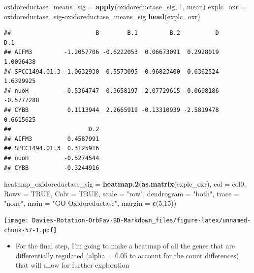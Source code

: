 \documentclass[
]{article}
\newenvironment{Shaded}{\begin{snugshade}}{\end{snugshade}}
\newcommand{\DataTypeTok}[1]{\textcolor[rgb]{0.13,0.29,0.53}{#1}}
\newcommand{\DecValTok}[1]{\textcolor[rgb]{0.00,0.00,0.81}{#1}}
\newcommand{\KeywordTok}[1]{\textcolor[rgb]{0.13,0.29,0.53}{\textbf{#1}}}
\newcommand{\NormalTok}[1]{#1}
\newcommand{\OperatorTok}[1]{\textcolor[rgb]{0.81,0.36,0.00}{\textbf{#1}}}
\newcommand{\OtherTok}[1]{\textcolor[rgb]{0.56,0.35,0.01}{#1}}
\newcommand{\StringTok}[1]{\textcolor[rgb]{0.31,0.60,0.02}{#1}}
\providecommand{\tightlist}{%
  \setlength{\itemsep}{0pt}\setlength{\parskip}{0pt}}
\begin{document}
\begin{Shaded}
\begin{Highlighting}[]
\NormalTok{oxidoreductase_means_sig =}\StringTok{ }\KeywordTok{apply}\NormalTok{(oxidoreductase_sig, }\DecValTok{1}\NormalTok{, mean)}
\NormalTok{explc_oxr =}\StringTok{ }\NormalTok{oxidoreductase_sig}\OperatorTok{-}\NormalTok{oxidoreductase_means_sig}
\KeywordTok{head}\NormalTok{(explc_oxr)}
\end{Highlighting}
\end{Shaded}

\begin{verbatim}
##                        B        B.1         B.2          D        D.1
## AIFM3         -1.2057706 -0.6222053  0.06673091  0.2928019  1.0096438
## SPCC1494.01.3 -1.0632930 -0.5573095 -0.96823400  0.6362524  1.6399925
## nuoH          -0.5364747 -0.3658197  2.07729615 -0.0698186 -0.5777288
## CYBB           0.1113944  2.2665919 -0.13310939 -2.5819478  0.6615625
##                      D.2
## AIFM3          0.4587991
## SPCC1494.01.3  0.3125916
## nuoH          -0.5274544
## CYBB          -0.3244916
\end{verbatim}

\begin{Shaded}
\begin{Highlighting}[]
\NormalTok{heatmap_oxidoreductase_sig =}\StringTok{ }\KeywordTok{heatmap.2}\NormalTok{(}\KeywordTok{as.matrix}\NormalTok{(explc_oxr), }\DataTypeTok{col =}\NormalTok{ col0, }\DataTypeTok{Rowv =} \OtherTok{TRUE}\NormalTok{, }\DataTypeTok{Colv =} \OtherTok{TRUE}\NormalTok{, }\DataTypeTok{scale =} \StringTok{"row"}\NormalTok{,}
                                   \DataTypeTok{dendrogram =} \StringTok{"both"}\NormalTok{,}
                                   \DataTypeTok{trace =} \StringTok{"none"}\NormalTok{,}
                                   \DataTypeTok{main =} \StringTok{"GO Oxidoreductase"}\NormalTok{,}
                                   \DataTypeTok{margin =} \KeywordTok{c}\NormalTok{(}\DecValTok{5}\NormalTok{,}\DecValTok{15}\NormalTok{))}
\end{Highlighting}
\end{Shaded}

\texttt{[image: Davies-Rotation-OrbFav-BD-Markdown\_files/figure-latex/unnamed-chunk-57-1.pdf]}

\begin{itemize}
\tightlist
\item
  For the final step, I'm going to make a heatmap of all the genes that
  are differentially regulated (alpha = 0.05 to account for the count
  differences) that will allow for further exploration
\end{itemize}
\end{document}
